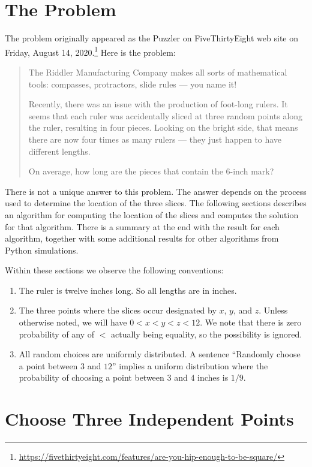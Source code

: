 \documentclass{article}
\begin{document}
\section{The Problem}

The problem originally appeared as the Puzzler on FiveThirtyEight web site on Friday, August 14, 2020.\footnote{\url{https://fivethirtyeight.com/features/are-you-hip-enough-to-be-square/}} Here is the problem:

\begin{quotation}
The Riddler Manufacturing Company makes all sorts of mathematical tools: compasses, protractors, slide rules — you name it!

Recently, there was an issue with the production of foot-long rulers. It seems that each ruler was accidentally sliced at three random points along the ruler, resulting in four pieces. Looking on the bright side, that means there are now four times as many rulers — they just happen to have different lengths.

On average, how long are the pieces that contain the 6-inch mark?
\end{quotation}

There is not a unique answer to this problem. The answer depends on the process used to determine the location of the three slices. The following sections describes an algorithm for computing the location of the slices and computes the solution for that algorithm. There is a summary at the end
with the result for each algorithm, together with some additional results for other algorithms from Python simulations.

Within these sections we observe the following conventions:
\begin{enumerate}
\item The ruler is twelve inches long. So all lengths are in inches.
\item The three points where the slices occur designated by $x$, $y$, and $z$. Unless otherwise noted, we will have $0 < x < y < z < 12$. We note that there is zero probability of any of $<$ actually being equality, so the possibility is ignored. 
\item All random choices are uniformly distributed. A sentence ``Randomly choose a point between $3$ and $12$'' implies a uniform distribution where the
probability of choosing a point between $3$ and $4$ inches is $1/9$.
\end{enumerate}

\section{Choose Three Independent Points}
\end{document}
